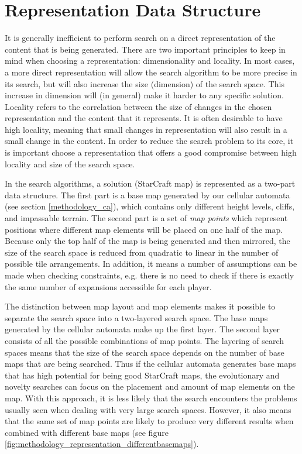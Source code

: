 \section{Representation Data Structure}
\label{methodology_representation}
It is generally inefficient to perform search on a direct representation of the content that is being generated. There are two important principles to keep in mind when choosing a representation: dimensionality and locality. In most cases, a more direct representation will allow the search algorithm to be more precise in its search, but will also increase the size (dimension) of the search space. This increase in dimension will (in general) make it harder to any specific solution. Locality refers to the correlation between the size of changes in the chosen representation and the content that it represents. It is often desirable to have high locality, meaning that small changes in representation will also result in a small change in the content\cite{togelius2015searchbased}. In order to reduce the search problem to its core, it is important choose a representation that offers a good compromise between high locality and size of the search space. 

In the search algorithms, a solution (StarCraft map) is represented as a two-part data structure. The first part is a base map generated by our cellular automata (see section \ref{methodology_ca}), which contains only different height levels, cliffs, and impassable terrain. The second part is a set of \textit{map points} which represent positions where different map elements will be placed on one half of the map. Because only the top half of the map is being generated and then mirrored, the size of the search space is reduced from quadratic to linear in the number of possible tile arrangements. In addition, it means a number of assumptions can be made when checking constraints, e.g. there is no need to check if there is exactly the same number of expansions accessible for each player.

The distinction between map layout and map elements makes it possible to separate the search space into a two-layered search space. The base maps generated by the cellular automata make up the first layer. The second layer consists of all the possible combinations of map points. The layering of search spaces means that the size of the search space depends on the number of base maps that are being searched. Thus if the cellular automata generates base maps that has high potential for being good StarCraft maps, the evolutionary and novelty searches can focus on the placement and amount of map elements on the map. With this approach, it is less likely that the search encounters the problems usually seen when dealing with very large search spaces. However, it also means that the same set of map points are likely to produce very different results when combined with different base maps (see figure \ref{fig:methodology_representation_differentbasemaps}).

